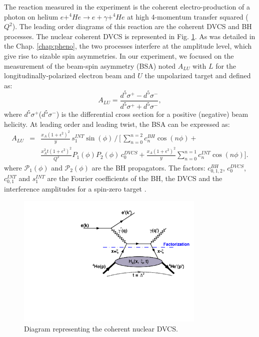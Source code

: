 \documentclass[aps,prc,preprint,superscriptaddress]{revtex4}
\begin{document}
The reaction measured in the experiment is the coherent electro-production of a photon on helium
$e+^4\!\!He \rightarrow e+\gamma+^4\!\!He$ at high 4-momentum transfer squared ($Q^2$). The leading order diagrams
of this reaction are the coherent DVCS and BH processes. The nuclear coherent DVCS is 
represented in Fig. \ref{fig:CohDiag}. As was detailed in the Chap. \ref{chap:pheno}, 
the two processes interfere at the amplitude level, which give rise to sizable spin asymmetries.
In our experiment, we focused on the measurement of the beam-spin asymmetry (BSA) noted $A_{LU}$ with 
$L$ for the longitudinally-polarized electron beam and $U$ the unpolarized target and defined as:  
\begin{equation}
A_{LU} = \frac{d^{5}\sigma^{+} - d^{5}\sigma^{-} }
              {d^{5}\sigma^{+} + d^{5}\sigma^{-}},
  \label{eq:BSA}
\end{equation}
where $d^{5}\sigma^{+}$($d^{5}\sigma^{-}$) is the differential cross section for a positive 
(negative) beam helicity. At leading order and leading twist, the BSA can be expressed as:        
\begin{eqnarray}
A_{LU}& =& \frac{x_A(1+\epsilon^2)^2}{y} \, s_1^{INT} \sin(\phi) \, 
\bigg/ \, \bigg[ \, \sum_{n=0}^{n=2}c_n^{BH}\cos{(n\phi)} +  \\
& & \frac{x_A^2 t {(1+\epsilon^2)}^2}{Q^2} P_1(\phi) P_2(\phi) \, c_0^{DVCS} + 
\frac{x_A (1+\epsilon^2)^2}{y} \sum_{n=0}^{n=1} c_n^{INT} \cos{(n\phi)} \bigg].  \nonumber 
\label{eq:coh_BSA}
\end{eqnarray}
where $\mathcal{P}_1(\phi)$ and $\mathcal {P}_2(\phi)$ are the BH 
propagators. The factors: $c_{0,1,2}^{BH}$, $c_0^{DVCS}$, $c_{0,1}^{INT}$ and 
$s_1^{INT}$ are the Fourier coefficients of the BH, the DVCS and the 
interference amplitudes for a spin-zero target \cite{Kirchner:2003wt}. %

\begin{figure}[tbp!]
\center
\includegraphics[width=9cm]{fig3/DVCS_diagram.pdf}
\caption{Diagram representing the coherent nuclear DVCS.}
\label{fig:CohDiag}
\end{figure}
\end{document}
